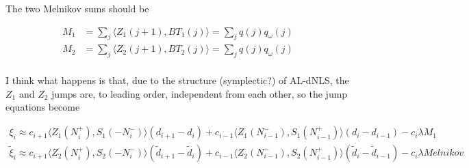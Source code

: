 \documentclass[12pt]{article}
\begin{document}
The two Melnikov sums should be

\begin{align*}
M_1 &= \sum_j \langle Z_1(j+1), B T_1(j) \rangle = \sum_j q(j) q_\omega(j) \\
M_2 &= \sum_j \langle Z_2(j+1), B T_2(j) \rangle = \sum_j q(j) q_\omega(j) \\
\end{align*}

I think what happens is that, due to the structure (symplectic?) of AL-dNLS, the $Z_1$ and $Z_2$ jumps are, to leading order, independent from each other, so the jump equations become

\begin{align*}
\xi_i \approx c_{i+1} \langle Z_1(N_i^+), S_1(-N_i^-) \rangle (d_{i+1} - d_i)
+ c_{i-1} \langle Z_1(N_{i-1}^-), S_1(N_{i-1}^+) \rangle (d_i - d_{i-1}) - c_i \lambda M_1 \\
\tilde{\xi}_i \approx c_{i+1} \langle Z_2(N_i^+), S_2(-N_i^-) \rangle (\tilde{d}_{i+1} - \tilde{d}_i)
+ c_{i-1} \langle Z_2(N_{i-1}^-), S_2(N_{i-1}^+) \rangle (\tilde{d}_i - \tilde{d}_{i-1}) - c_i \lambda Melnikov
\end{align*}
\end{document}
